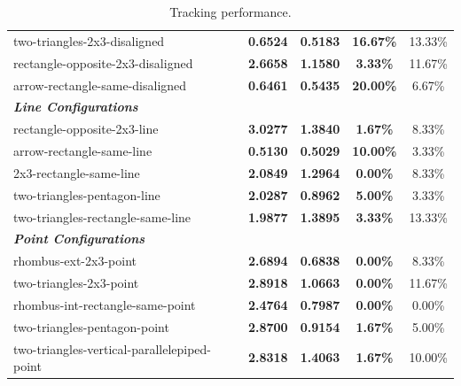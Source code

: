 \begin{table}[htbp]
{\begin{tabular}{lcccc}
two-triangles-2x3-disaligned & \textbf{0.6524} & \textbf{0.5183} & \textbf{16.67\%} & 13.33\% \\
rectangle-opposite-2x3-disaligned & \textbf{2.6658} & \textbf{1.1580} & \textbf{3.33\%} & 11.67\% \\
arrow-rectangle-same-disaligned & \textbf{0.6461} & \textbf{0.5435} & \textbf{20.00\%} & 6.67\% \\
\midrule
\multicolumn{5}{l}{\textit{\textbf{Line Configurations}}} \\
\midrule
rectangle-opposite-2x3-line & \textbf{3.0277} & \textbf{1.3840} & \textbf{1.67\%} & 8.33\% \\
arrow-rectangle-same-line & \textbf{0.5130} & \textbf{0.5029} & \textbf{10.00\%} & 3.33\% \\
2x3-rectangle-same-line & \textbf{2.0849} & \textbf{1.2964} & \textbf{0.00\%} & 8.33\% \\
two-triangles-pentagon-line & \textbf{2.0287} & \textbf{0.8962} & \textbf{5.00\%} & 3.33\% \\
two-triangles-rectangle-same-line & \textbf{1.9877} & \textbf{1.3895} & \textbf{3.33\%} & 13.33\% \\
\midrule
\multicolumn{5}{l}{\textit{\textbf{Point Configurations}}} \\
\midrule
rhombus-ext-2x3-point & \textbf{2.6894} & \textbf{0.6838} & \textbf{0.00\%} & 8.33\% \\
two-triangles-2x3-point & \textbf{2.8918} & \textbf{1.0663} & \textbf{0.00\%} & 11.67\% \\
rhombus-int-rectangle-same-point & \textbf{2.4764} & \textbf{0.7987} & \textbf{0.00\%} & 0.00\% \\
two-triangles-pentagon-point & \textbf{2.8700} & \textbf{0.9154} & \textbf{1.67\%} & 5.00\% \\
two-triangles-vertical-parallelepiped-point & \textbf{2.8318} & \textbf{1.4063} & \textbf{1.67\%} & 10.00\% \\
\bottomrule
\end{tabular}}
\caption{Tracking performance.}
\label{tab:tracking_all_configurations}
\end{table}


